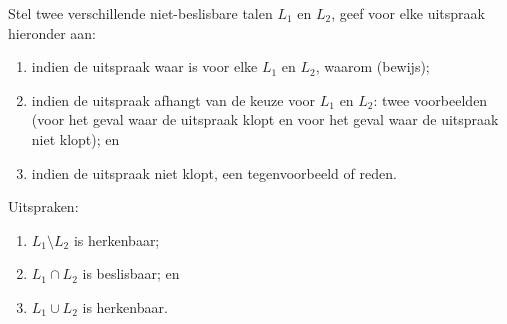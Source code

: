 \documentclass{article}
\begin{document}
\begin{question}
Stel twee verschillende niet-beslisbare talen $L_1$ en $L_2$, geef voor elke uitspraak hieronder aan:
\begin{enumerate}
 \item indien de uitspraak waar is voor elke $L_1$ en $L_2$, waarom (bewijs);
 \item indien de uitspraak afhangt van de keuze voor $L_1$ en $L_2$: twee voorbeelden (voor het geval waar de uitspraak klopt en voor het geval waar de uitspraak niet klopt); en
 \item indien de uitspraak niet klopt, een tegenvoorbeeld of reden.
\end{enumerate}
Uitspraken:
\begin{enumerate}
 \item $L_1\setminus L_2$ is herkenbaar;
 \item $L_1\cap L_2$ is beslisbaar; en
 \item $L_1\cup L_2$ is herkenbaar.
\end{enumerate}
\end{question}
\end{document}

